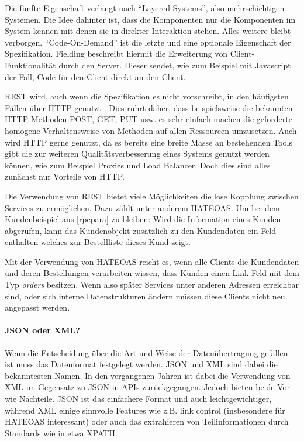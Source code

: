 \documentclass[12pt,a4paper,bibliography=totocnumbered,listof=totocnumbered]{scrartcl}
\begin{document}

Die fünfte Eigenschaft verlangt nach \enquote{Layered Systems}, also mehrschichtigen Systemen. Die Idee dahinter ist, dass die Komponenten nur die Komponenten im System kennen mit denen sie in direkter Interaktion stehen. Alles weitere bleibt verborgen.
\enquote{Code-On-Demand} ist die letzte und eine optionale Eigenschaft der Spezifikation. Fielding beschreibt hiermit die Erweiterung von Client-Funktionalität durch den Server. Dieser sendet, wie zum Beispiel mit Javascript der Fall, Code für den Client direkt an den Client.\cite{fielding}

REST wird, auch wenn die Spezifikation es nicht vorschreibt, in den häufigsten Fällen über HTTP genutzt \cite[S.97]{buildingms}. Dies rührt daher, dass beispielsweise die bekannten HTTP-Methoden POST, GET, PUT usw. es sehr einfach machen die geforderte homogene Verhaltensweise von Methoden auf allen Ressourcen umzusetzen. Auch wird HTTP gerne genutzt, da es bereits eine breite Masse an bestehenden Tools gibt die zur weiteren Qualitätsverbesserung eines Systems genutzt werden können, wie zum Beispiel Proxies und Load Balancer. Doch dies sind alles zunächst nur Vorteile von HTTP.

Die Verwendung von REST bietet viele Möglichkeiten die lose Kopplung zwischen Services zu ermöglichen. Dazu zählt unter anderem \ac{HATEOAS}. Um bei dem Kundenbeispiel aus \ref{rpcpara} zu bleiben: Wird die Information eines Kunden abgerufen, kann das Kundenobjekt zusätzlich zu den Kundendaten ein Feld enthalten welches zur Bestellliste dieses Kund zeigt.



Mit der Verwendung von HATEOAS reicht es, wenn alle Clients die Kundendaten und deren Bestellungen verarbeiten wissen, dass Kunden einen Link-Feld mit dem Typ \textit{orders} besitzen. Wenn also später Services unter anderen Adressen erreichbar sind, oder sich interne Datenstrukturen ändern müssen diese Clients nicht neu angepasst werden.

\paragraph{JSON oder XML?} 

Wenn die Entscheidung über die Art und Weise der Datenübertragung gefallen ist muss das Datenformat festgelegt werden. JSON und XML sind dabei die bekanntesten Namen. In den vergangenen Jahren ist dabei die Verwendung von XML im Gegensatz zu JSON in \acp{API} zurückgegangen\cite{duvander2}. Jedoch bieten beide Vor- wie Nachteile. JSON ist das einfachere Format und auch leichtgewichtiger, während XML einige sinnvolle Features wie z.B. link control (insbesondere für HATEOAS interessant) oder auch das extrahieren von Teilinformationen durch Standards wie in etwa XPATH\cite[S.101]{buildingms}.
\end{document}
